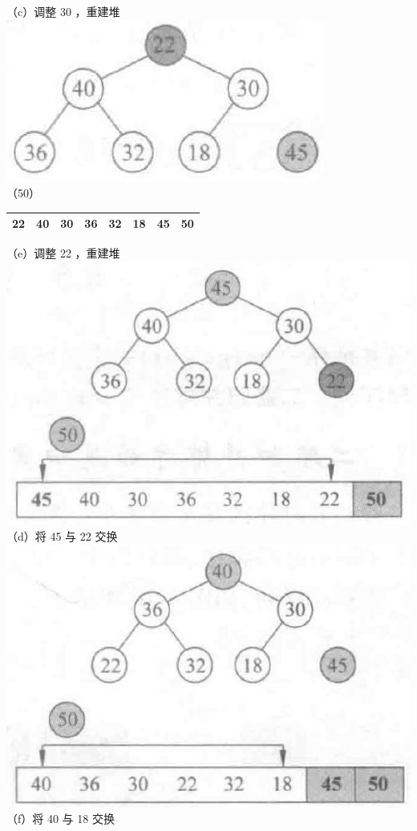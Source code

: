 \documentclass[10pt]{article}
\begin{document}
（c）调整 30 ，重建堆\\
\includegraphics[max width=\textwidth, center]{2025_06_06_704745ea57b15b2333e5g-286}\\
（50）

\begin{center}
\begin{tabular}{|llllll|l|l|}
\hline
22 & 40 & 30 & 36 & 32 & 18 & 45 & 50 \\
\hline
\end{tabular}
\end{center}

（e）调整 22 ，重建堆\\
\includegraphics[max width=\textwidth, center]{2025_06_06_704745ea57b15b2333e5g-286(2)}\\
（d）将 45 与 22 交换\\
\includegraphics[max width=\textwidth, center]{2025_06_06_704745ea57b15b2333e5g-286(3)}\\
（f）将 40 与 18 交换
\end{document}
